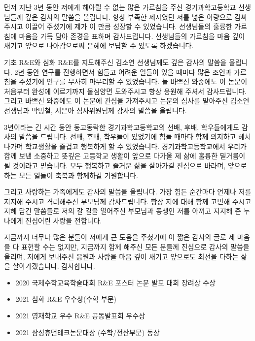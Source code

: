 \documentclass{gshs_thesis}
\theoremstyle{theorem}
\theoremstyle{lemma}
\theoremstyle{definition}
\begin{document}
\begin{acknowledgements}
먼저 지난 3년 동안 저에게 헤아릴 수 없는 많은 가르침을 주신 경기과학고등학교 선생님들께 깊은 감사의 말씀을 올립니다. 항상 부족한 제자였던 저를 넓은 아량으로 감싸주시고 이끌어 주셨기에 제가 이 만큼 성장할 수 있었습니다. 선생님들의 훌륭한 가르침에 마음을 가득 담아 존경을 표하며 감사드립니다. 선생님들의 가르침을 마음 깊이 새기고 앞으로 나아감으로써 은혜에 보답할 수 있도록 하겠습니다. 

기초 R$\&$E와 심화 R$\&$E를 지도해주신 김소연 선생님께도 깊은 감사의 말씀을 올립니다. 2년 동안 연구를 진행하면서 힘들고 어려운 일들이 있을 때마다 많은 조언과 가르침을 주셨기에 연구를 무사히 마무리할 수 있었습니다. 늘 바쁘신 와중에도 이 논문이 처음부터 완성에 이르기까지 물심양면 도와주시고 항상 응원해 주셔서 감사드립니다. 그리고 바쁘신 와중에도 이 논문에 관심을 가져주시고 논문의 심사를 맡아주신 김소연 선생님과 박병철, 서은아 심사위원님께 감사의 말씀을 올립니다.

3년이라는 긴 시간 동안 동고동락한 경기과학고등학교의 선배, 후배, 학우들에게도 감사의 말씀을 드립니다. 선배, 후배, 학우들이 있었기에 힘들 때마다 함께 의지하고 헤쳐나가며 학교생활을 즐겁고 행복하게 할 수 있었습니다. 경기과학고등학교에서 우리가 함께 보낸 소중하고 뜻깊은 고등학교 생활이 앞으로 다가올 제 삶에 훌륭한 밑거름이 될 것이라고 믿습니다. 모두 행복하고 즐거운 삶을 살아가길 진심으로 바라며, 앞으로 하는 모든 일들이 축복과 함께하길 기원합니다.

그리고 사랑하는 가족에게도 감사의 말씀을 올립니다. 가장 힘든 순간마다 언제나 저를 지지해 주시고 격려해주신 부모님께 감사드립니다. 항상 저에 대해 함께 고민해 주시고 지혜 담긴 말씀들로 저의 갈 길을 열어주신 부모님과 동생인 저를 아끼고 지지해 준 누나에게 진심어린 사랑을 전합니다. 

지금까지 너무나 많은 분들이 저에게 큰 도움을 주셨기에 이 짧은 감사의 글로 제 마음을 다 표현할 수는 없지만, 지금까지 함께 해주신 모든 분들께 진심으로 감사의 말씀을 올리며, 저에게 보내주신 응원과 사랑을 마음 깊이 새기고 앞으로도 최선을 다하는 삶을 살아가겠습니다. 감사합니다.
\end{acknowledgements}
\begin{researches}
\begin{itemize}
\item{2020 국제수학교육학술대회 R$\&$E 포스터 논문 발표 대회 장려상 수상}
\item{2021 심화 R$\&$E 우수상(수학 부문)}
\item{2021 영재학교 우수 R$\&$E 공동발표회 우수상}
\item{2021 삼성휴먼테크논문대상 (수학/전산부문) 동상}
\end{itemize}
\end{researches}
\end{document}
